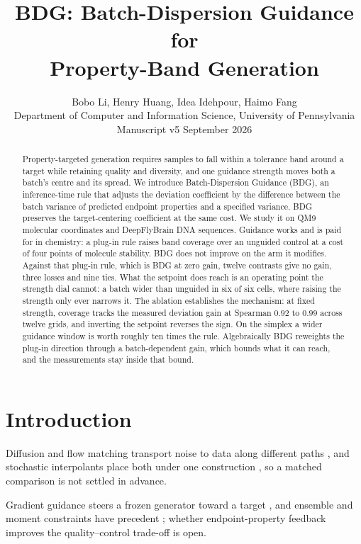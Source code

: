 \documentclass{article}
\title{BDG: Batch-Dispersion Guidance for\\Property-Band Generation}
\author{Bobo Li, Henry Huang, Idea Idehpour, Haimo Fang\\
Department of Computer and Information Science, University of Pennsylvania\\
\small Manuscript v5 \quad 28 September 2026}
\begin{document}
\maketitle
\begin{abstract}
Property-targeted generation requires samples to fall within a tolerance band around a target while retaining quality and diversity, and one guidance strength moves both a batch's centre and its spread. We introduce Batch-Dispersion Guidance (BDG), an inference-time rule that adjusts the deviation coefficient by the difference between the batch variance of predicted endpoint properties and a specified variance. BDG preserves the target-centering coefficient at the same cost. We study it on QM9 molecular coordinates and DeepFlyBrain DNA sequences. Guidance works and is paid for in chemistry: a plug-in rule raises band coverage over an unguided control at a cost of four points of molecule stability. BDG does not improve on the arm it modifies. Against that plug-in rule, which is BDG at zero gain, twelve contrasts give no gain, three losses and nine ties. What the setpoint does reach is an operating point the strength dial cannot: a batch wider than unguided in six of six cells, where raising the strength only ever narrows it. The ablation establishes the mechanism: at fixed strength, coverage tracks the measured deviation gain at Spearman $0.92$ to $0.99$ across twelve grids, and inverting the setpoint reverses the sign. On the simplex a wider guidance window is worth roughly ten times the rule. Algebraically BDG reweights the plug-in direction through a batch-dependent gain, which bounds what it can reach, and the measurements stay inside that bound.
\end{abstract}

\section{Introduction}
Diffusion and flow matching transport noise to data along different paths \citep{karras2022elucidating,lipman2022flow}, and stochastic interpolants place both under one construction \citep{albergo2025stochastic}, so a matched comparison is not settled in advance.

Gradient guidance steers a frozen generator toward a target \citep{chung2023dps,song2023lgd}, and ensemble and moment constraints have precedent \citep{corso2024particle,mgd2026moment}; whether endpoint-property feedback improves the quality--control trade-off is open.
\end{document}
